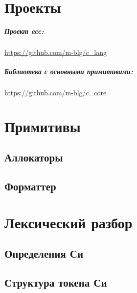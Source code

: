 
\chapter{Проекты}
\paragraph{Проект ecc:} \label{extras:ecc} 
\url{https://github.com/m-blg/c_lang}

\paragraph{Библиотека с основными примитивами:} \label{extras:c-core}
\url{https://github.com/m-blg/c_core}


\chapter{Примитивы}
\section*{Аллокаторы}




\section*{Форматтер}



\chapter{Лексический разбор}

\section*{Определения Си}


\section*{Структура токена Си}


